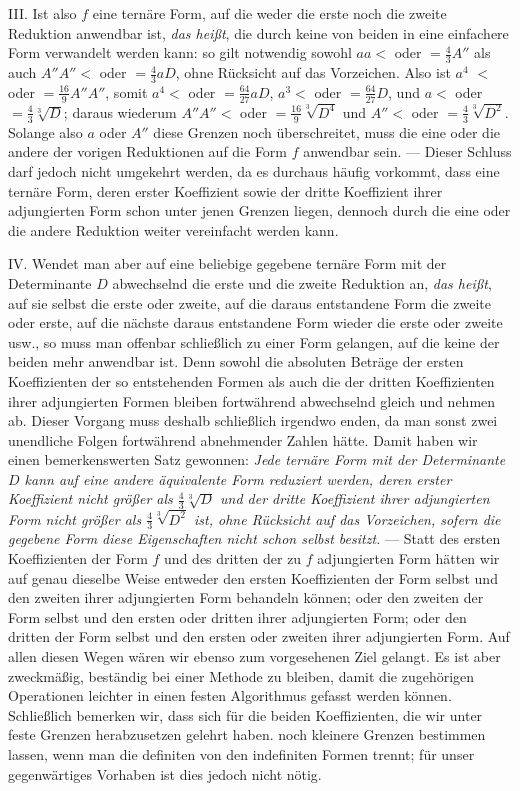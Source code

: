 III. Ist also \(f\) eine ternäre Form, auf die weder die erste noch die zweite Reduktion anwendbar ist, \emph{das heißt}, die durch keine von beiden in eine einfachere Form verwandelt werden kann: so gilt notwendig sowohl \(aa<\) oder \(=\frac{4}{3}A''\) als auch \(A''A''<\) oder \(=\frac{4}{3}aD\), ohne Rücksicht auf das Vorzeichen. Also ist \(a^4\) \(<\) oder \(=\frac{16}{9}A''A''\), somit \(a^4<\) oder \(=\frac{64}{27}aD\), \(a^3<\) oder \(=\frac{64}{27}D\), und \(a<\) oder \(=\frac{4}{3}\sqrt[3]{D}\); daraus wiederum \(A''A''<\) oder \(=\frac{16}{9}\sqrt[3]{D^4}\) und \(A''<\) oder \(=\frac{4}{3}\sqrt[3]{D^2}\). Solange also \(a\) oder \(A''\) diese Grenzen noch überschreitet, muss die eine oder die andere der vorigen Reduktionen auf die Form \(f\) anwendbar sein. --- Dieser Schluss darf jedoch nicht umgekehrt werden, da es durchaus häufig
vorkommt, dass eine ternäre Form, deren erster Koeffizient sowie der dritte Koeffizient ihrer adjungierten Form schon unter jenen Grenzen liegen, dennoch durch die eine oder die andere Reduktion weiter vereinfacht werden kann.

IV. Wendet man aber auf eine beliebige gegebene ternäre Form mit der Determinante \(D\) abwechselnd die erste und die zweite Reduktion an, \emph{das heißt}, auf sie selbst die erste oder zweite, auf die daraus entstandene Form die zweite oder erste, auf die nächste daraus entstandene Form wieder die erste oder zweite usw., so muss man offenbar schließlich zu einer Form gelangen, auf die keine der beiden mehr anwendbar ist. Denn sowohl die absoluten Beträge der ersten Koeffizienten der so entstehenden Formen als auch die der dritten Koeffizienten ihrer adjungierten Formen bleiben fortwährend abwechselnd gleich und nehmen ab. Dieser Vorgang muss deshalb schließlich irgendwo enden, da man sonst zwei unendliche Folgen fortwährend abnehmender Zahlen hätte. Damit haben wir einen bemerkenswerten Satz gewonnen: \emph{Jede ternäre Form mit der Determinante \(D\) kann auf eine andere äquivalente Form reduziert werden, deren erster Koeffizient nicht größer als \(\frac{4}{3}\sqrt[3]{D}\) und der dritte Koeffizient ihrer adjungierten Form nicht größer als \(\frac{4}{3}\sqrt[3]{D^2}\) ist, ohne Rücksicht auf das Vorzeichen, sofern die gegebene Form diese Eigenschaften nicht schon selbst besitzt.} --- Statt des ersten Koeffizienten der Form \(f\) und des dritten der zu \(f\) adjungierten Form hätten wir auf genau dieselbe Weise entweder den ersten Koeffizienten der Form selbst und den zweiten ihrer adjungierten Form behandeln können; oder den zweiten der Form selbst und den ersten oder dritten ihrer adjungierten Form; oder den dritten der Form selbst und den ersten oder zweiten ihrer adjungierten Form. Auf allen diesen Wegen wären wir ebenso zum vorgesehenen Ziel gelangt. Es ist aber zweckmäßig, beständig bei einer Methode zu bleiben, damit die zugehörigen Operationen leichter in einen festen Algorithmus gefasst werden können. Schließlich bemerken wir, dass sich für die beiden Koeffizienten, die wir unter feste Grenzen herabzusetzen gelehrt haben. noch kleinere Grenzen bestimmen lassen, wenn man die definiten von den indefiniten Formen trennt; für unser gegenwärtiges Vorhaben ist dies jedoch nicht nötig.
